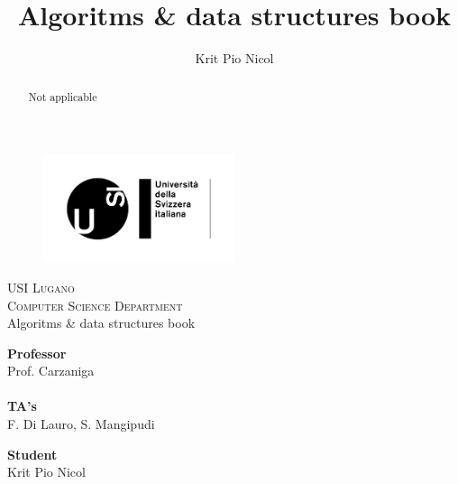 \documentclass[a4paper]{report}
\author{Krit Pio Nicol}
\title{Algoritms \& data structures book}
\begin{document}

\begin{titlepage}
\begin{figure}[t]
    \centering\includegraphics[width=0.5\textwidth]{Figures/usilogo.png}
\end{figure}

\begin{center}
    \textsc{\LARGE{USI Lugano\\}}
	\textsc{ \LARGE{Computer Science Department\\ }}
	\vspace{40mm}
	\fontsize{10mm}{7mm}\selectfont 
    \textup{Algoritms \& data structures book}\\
\end{center}

\vspace{25mm}

\begin{minipage}[t]{0.47\textwidth}
	\textnormal{\large{\bf Professor\\}}
	{\large Prof. Carzaniga\\ \\}
 \textnormal{\large{\bf TA's\\}}
	{\large F. Di Lauro, S. Mangipudi}
\end{minipage}\hfill\begin{minipage}[t]{0.47\textwidth}\raggedleft
	\textnormal{\large{\bf Student\\}}
	{\large Krit Pio Nicol}
\end{minipage}

\vspace{20mm}


\end{titlepage}

\begin{abstract}

    Not applicable
    
\end{abstract}
\end{document}
